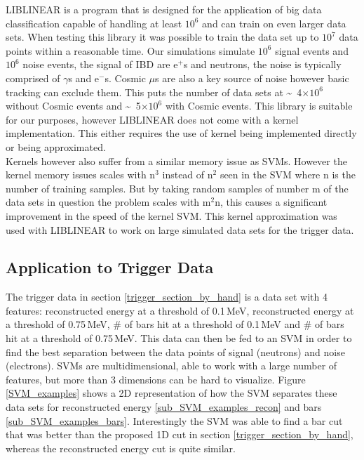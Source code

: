 \documentclass[12pt,a4paper]{article}
\begin{document}
LIBLINEAR is a program that is designed for the application of big data classification capable of handling at least $10^6$ \cite{liblinear_paper} and can train on even larger data sets. When testing this library it was possible to train the data set up to $10^7$ data points within a reasonable time. Our simulations simulate $10^6$ signal events and $10^6$ noise events, the signal of IBD are e$^+$s and neutrons, the noise is typically comprised of $\gamma$s and e$^-$s. Cosmic $\mu$s are also a key source of noise however basic tracking can exclude them. This puts the number of data sets at \sim ~4$\times 10^6$ without Cosmic events and \sim ~5$\times 10^6$ with Cosmic events. This library is suitable for our purposes, however LIBLINEAR does not come with a kernel implementation. This either requires the use of kernel being implemented directly or being approximated. \\

Kernels however also suffer from  a similar memory issue as SVMs. However the kernel memory issues scales with n$^3$ \cite{nystrom_paper} instead of n$^2$ seen in the SVM \cite{microsoft_smo} where n is the number of training samples. But by taking random samples of number m of the data sets in question the problem scales with m$^2$n, this causes a significant improvement in the speed of the kernel SVM. This kernel approximation was used with LIBLINEAR to work on large simulated data sets for the trigger data. 

\subsection{Application to Trigger Data}
The trigger data in section \ref{trigger_section_by_hand} is a data set with 4 features: reconstructed energy at a threshold of 0.1\,MeV, reconstructed energy at a threshold of 0.75\,MeV, \# of bars hit at a threshold of 0.1\,MeV and \# of bars hit at a threshold of 0.75\,MeV. This data can then be fed to an SVM in order to find the best separation between the data points of signal (neutrons) and noise (electrons). SVMs are multidimensional, able to work with a large number of features, but more than 3 dimensions can be hard to visualize. Figure \ref{SVM_examples} shows a 2D representation of how the SVM separates these data sets for reconstructed energy \ref{sub_SVM_examples_recon} and bars \ref{sub_SVM_examples_bars}. Interestingly the SVM was able to find a bar cut that was better than the proposed 1D cut in section \ref{trigger_section_by_hand}, whereas the reconstructed energy cut is quite similar. 
\end{document}
